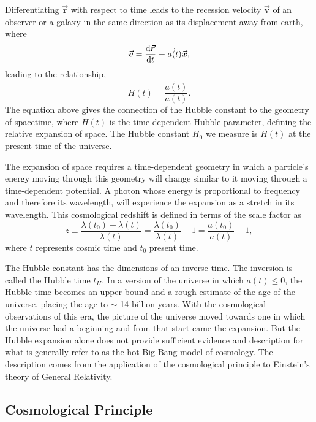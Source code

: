 Differentiating $\boldsymbol{\vec{r}}$ with respect to time leads to the recession velocity $\boldsymbol{\vec{v}}$ of an observer or a galaxy in the same direction as its displacement away from earth, where
%
\begin{equation}
  \boldsymbol{\vec{v}} = \dv{\boldsymbol{\vec{r}}}{t} \equiv  \dot{a(t)}\boldsymbol{\vec{x}},
\end{equation}
%
leading to the relationship,
%
\begin{equation}
  H(t) = \frac{\dot{a(t)}}{a(t)}.
\end{equation}
%
The equation above gives the connection of the Hubble constant to the geometry of spacetime, where $H(t)$ is the time-dependent Hubble parameter, defining the relative expansion of space. The Hubble constant $H_0$ we measure is $H(t)$ at the present time of the universe.

The expansion of space requires a time-dependent geometry in which a particle's energy moving through this geometry will change similar to it moving through a time-dependent potential. A photon whose energy is proportional to frequency and therefore its wavelength, will experience the expansion as a stretch in its wavelength. This cosmological redshift is defined in terms of the scale factor as
%
\begin{equation}
  z \equiv \frac{\lambda(t_0) - \lambda(t)}{\lambda(t)} = \frac{\lambda(t_0)}{\lambda(t)} -1 = \frac{a(t_0)}{a(t)} - 1,
\end{equation}
%
where $t$ represents cosmic time and $t_0$ present time.

The Hubble constant has the dimensions of an inverse time. The inversion is called the Hubble time $t_H$. In a version of the universe in which $\ddot{a(t)} \leq 0$, the Hubble time becomes an upper bound and a rough estimate of the age of the universe, placing the age to $\sim$ 14 billion years. With the cosmological observations of this era, the picture of the universe moved towards one in which the universe had a beginning and from that start came the expansion. But the Hubble expansion alone does not provide sufficient evidence and description for what is generally refer to as the hot Big Bang model of cosmology. The description comes from the application of the cosmological principle to Einstein's theory of General Relativity.

\subsection{Cosmological Principle}
\label{subsec:cosmological_principle}

